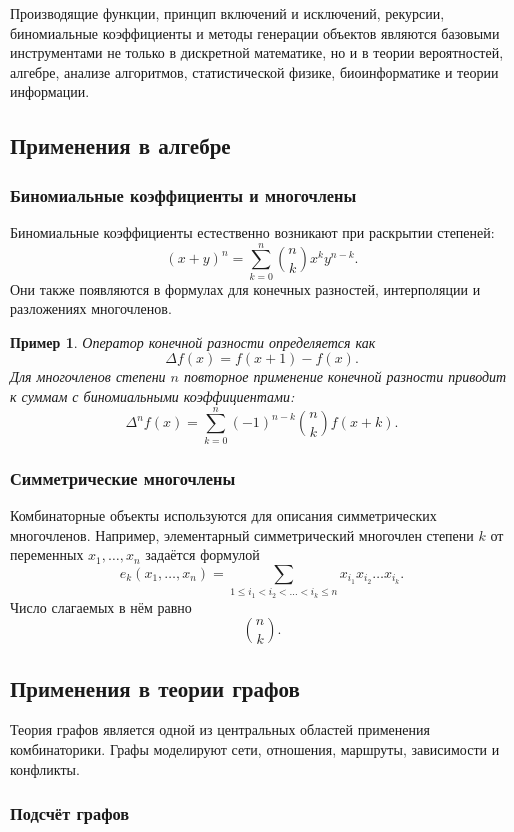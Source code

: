 \documentclass[12pt,a4paper]{article}
\newtheorem{example}{Пример}
\begin{document}
Производящие функции, принцип включений и исключений, рекурсии, биномиальные коэффициенты и методы генерации объектов являются базовыми инструментами не только в дискретной математике, но и в теории вероятностей, алгебре, анализе алгоритмов, статистической физике, биоинформатике и теории информации.

\subsection{Применения в алгебре}

\subsubsection{Биномиальные коэффициенты и многочлены}

Биномиальные коэффициенты естественно возникают при раскрытии степеней:
\[
(x+y)^n=\sum_{k=0}^{n}\binom{n}{k}x^ky^{n-k}.
\]
Они также появляются в формулах для конечных разностей, интерполяции и разложениях многочленов.

\begin{example}
Оператор конечной разности определяется как
\[
\Delta f(x)=f(x+1)-f(x).
\]
Для многочленов степени $n$ повторное применение конечной разности приводит к суммам с биномиальными коэффициентами:
\[
\Delta^n f(x)
=
\sum_{k=0}^{n}(-1)^{n-k}\binom{n}{k}f(x+k).
\]
\end{example}

\subsubsection{Симметрические многочлены}

Комбинаторные объекты используются для описания симметрических многочленов. Например, элементарный симметрический многочлен степени $k$ от переменных $x_1,\dots,x_n$ задаётся формулой
\[
e_k(x_1,\dots,x_n)
=
\sum_{1\le i_1<i_2<\dots<i_k\le n}
x_{i_1}x_{i_2}\dots x_{i_k}.
\]
Число слагаемых в нём равно
\[
\binom{n}{k}.
\]

\subsection{Применения в теории графов}

Теория графов является одной из центральных областей применения комбинаторики. Графы моделируют сети, отношения, маршруты, зависимости и конфликты.

\subsubsection{Подсчёт графов}
\end{document}

